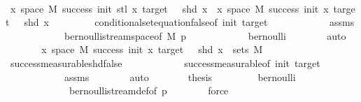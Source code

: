 \begin{isabellebody}
\ \ \isamarkupfalse%
{\isacharminus}{\kern0pt}\isanewline
\ \ \ \ \isamarkupfalse%
\ {\isachardoublequoteopen}{\isacharbraceleft}{\kern0pt}x{\isasymin}\ space\ M{\isachardot}{\kern0pt}\ success\ {\isacharparenleft}{\kern0pt}init{\isacharminus}{\kern0pt}{}{\isacharparenright}{\kern0pt}\ {\isacharparenleft}{\kern0pt}stl\ x{\isacharparenright}{\kern0pt}\ target\ {\isasymand}\ {\isasymnot}\ shd\ x{\isacharbraceright}{\kern0pt}\ {\isacharequal}{\kern0pt}\ {\isacharbraceleft}{\kern0pt}x{\isasymin}\ space\ M{\isachardot}{\kern0pt}\ success\ init\ x\ target\ {\isasymand}\ {\isasymnot}\ shd\ x{\isacharbraceright}{\kern0pt}{\isachardoublequoteclose}\isanewline
\ \ \ \ \ \ \isamarkupfalse%
\ \ conditional{\isacharunderscore}{\kern0pt}set{\isacharunderscore}{\kern0pt}equation{\isacharunderscore}{\kern0pt}false{\isacharbrackleft}{\kern0pt}of\ init\ target{\isacharbrackright}{\kern0pt}\isanewline
\ \ \ \ \ \ \ \ \ \ \ \ assms\isanewline
\ \ \ \ \ \ \ \ \ \ \ \ bernoulli{\isacharunderscore}{\kern0pt}stream{\isacharunderscore}{\kern0pt}space{\isacharbrackleft}{\kern0pt}of\ M\ p{\isacharbrackright}{\kern0pt}\isanewline
\ \ \ \ \ \ \ \ \ \ \ \ bernoulli\isanewline
\ \ \ \ \ \ \isamarkupfalse%
\ auto\isanewline
\ \ \ \ \isamarkupfalse%
\ \isamarkupfalse%
\ {\isachardoublequoteopen}{\isacharbraceleft}{\kern0pt}x{\isasymin}\ space\ M{\isachardot}{\kern0pt}\ success\ init\ x\ target\ {\isasymand}\ {\isasymnot}\ shd\ x{\isacharbraceright}{\kern0pt}\ {\isasymin}\ sets\ M\ {\isachardoublequoteclose}\isanewline
\ \ \ \ \ \ \isamarkupfalse%
\ success{\isacharunderscore}{\kern0pt}measurable{\isacharunderscore}{\kern0pt}shd{\isacharunderscore}{\kern0pt}false\isanewline
\ \ \ \ \ \ \ \ \ \ \ \ success{\isacharunderscore}{\kern0pt}measurable{\isacharbrackleft}{\kern0pt}of\ init\ target{\isacharbrackright}{\kern0pt}\isanewline
\ \ \ \ \ \ \ \ \ \ \ \ assms\isanewline
\ \ \ \ \ \ \isamarkupfalse%
\ auto\isanewline
\ \ \ \ \isamarkupfalse%
\ \isamarkupfalse%
\ {\isacharquery}{\kern0pt}thesis\isanewline
\ \ \ \ \ \ \isamarkupfalse%
\ \ bernoulli\isanewline
\ \ \ \ \ \ \ \ \ \ \ \ \ bernoulli{\isacharunderscore}{\kern0pt}stream{\isacharunderscore}{\kern0pt}def{\isacharbrackleft}{\kern0pt}of\ p{\isacharbrackright}{\kern0pt}\isanewline
\ \ \ \ \ \ \isamarkupfalse%
\ force\isanewline
\ \ \isamarkupfalse%
\isanewline
\ \ \isamarkupfalse%

\end{isabellebody}
